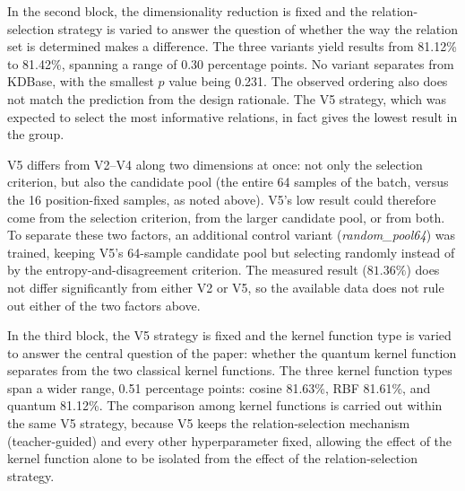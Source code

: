 In the second block, the dimensionality reduction is fixed and the
relation-selection strategy is varied to answer the question of
whether the way the relation set is determined makes a difference.
The three variants yield results from 81.12\% to 81.42\%, spanning a
range of 0.30 percentage points. No variant separates from KDBase,
with the smallest $p$ value being 0.231. The observed ordering also
does not match the prediction from the design rationale. The V5
strategy, which was expected to select the most informative
relations, in fact gives the lowest result in the group.

V5 differs from V2--V4 along two dimensions at once: not only the
selection criterion, but also the candidate pool (the entire 64
samples of the batch, versus the 16 position-fixed samples, as noted
above). V5's low result could therefore come from the selection
criterion, from the larger candidate pool, or from both. To separate
these two factors, an additional control variant
(\emph{random\_pool64}) was trained, keeping V5's 64-sample candidate
pool but selecting randomly instead of by the entropy-and-disagreement
criterion. The measured result ($81.36\%$) does not differ
significantly from either V2 or V5, so the available data does not
rule out either of the two factors above.

In the third block, the V5 strategy is fixed and the kernel function
type is varied to answer the central question of the paper: whether
the quantum kernel function separates from the two classical kernel
functions. The three kernel function types span a wider range, 0.51
percentage points: cosine 81.63\%, RBF 81.61\%, and quantum 81.12\%.
The comparison among kernel functions is carried out within the same
V5 strategy, because V5 keeps the relation-selection mechanism
(teacher-guided) and every other hyperparameter fixed, allowing the
effect of the kernel function alone to be isolated from the effect
of the relation-selection strategy.

